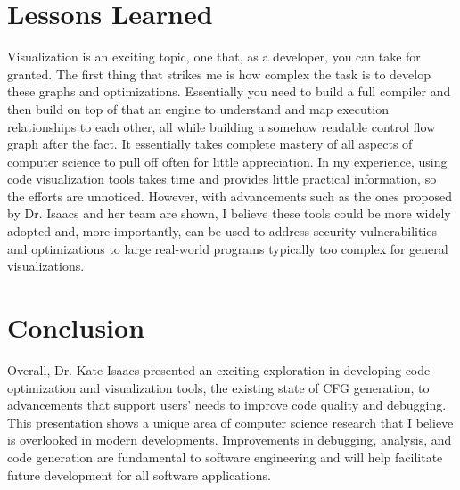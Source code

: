 \documentclass[journal,onecolumn]{IEEEtran}
\begin{document}
\section{Lessons Learned}

Visualization is an exciting topic, one that, as a developer, you can take for granted. The first thing that strikes me is how complex the task is to develop these graphs and optimizations. Essentially you need to build a full compiler and then build on top of that an engine to understand and map execution relationships to each other, all while building a somehow readable control flow graph after the fact. It essentially takes complete mastery of all aspects of computer science to pull off often for little appreciation. In my experience, using code visualization tools takes time and provides little practical information, so the efforts are unnoticed. However, with advancements such as the ones proposed by Dr. Isaacs and her team are shown, I believe these tools could be more widely adopted and, more importantly, can be used to address security vulnerabilities and optimizations to large real-world programs typically too complex for general visualizations. 

\section{Conclusion}

Overall, Dr. Kate Isaacs presented an exciting exploration in developing code optimization and visualization tools, the existing state of CFG generation, to advancements that support users' needs to improve code quality and debugging. This presentation shows a unique area of computer science research that I believe is overlooked in modern developments. Improvements in debugging, analysis, and code generation are fundamental to software engineering and will help facilitate future development for all software applications. 


\end{document}
